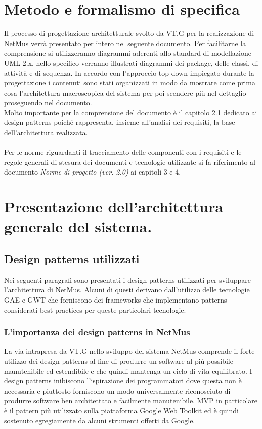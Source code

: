\section{Metodo e formalismo di specifica}
Il processo di progettazione architetturale svolto da VT.G per la
realizzazione di NetMus verr\`a presentato per intero nel seguente documento. Per
facilitarne la comprensione si utilizzeranno diagrammi aderenti allo
standard di modellazione UML 2.x, nello specifico verranno illustrati diagrammi
dei package, delle classi, di attivit\`a e di sequenza.
In accordo con l'approccio top-down impiegato durante la progettazione i
contenuti sono stati organizzati in modo da mostrare come prima cosa
l'architettura macroscopica del sistema per poi scendere pi\`u nel dettaglio
proseguendo nel documento.\\
Molto importante per la comprensione del documento \`e il capitolo 2.1 dedicato
ai design patterns poich\'e rappresenta, insieme all'analisi dei requisiti, la
base dell'architettura realizzata.
\\\\
Per le norme riguardanti il tracciamento delle componenti con i requisiti e le
regole generali di stesura dei documenti e tecnologie utilizzate si fa
riferimento al documento \emph{Norme di progetto (ver. 2.0)} ai capitoli 3 e 4.

\section{Presentazione dell'architettura generale del sistema.}

\subsection{Design patterns utilizzati}
Nei seguenti paragrafi sono presentati i design patterns utilizzati per
sviluppare l'architettura di NetMus. Alcuni di questi derivano dall'utilizzo
delle tecnologie GAE e GWT che forniscono dei frameworks che implementano
patterns considerati best-practices per queste particolari tecnologie.

\subsubsection{L'importanza dei design patterns in NetMus}
La via intrapresa da VT.G nello sviluppo del sistema NetMus comprende il forte
utilizzo dei design patterns al fine di produrre un software al pi\`u
possibile manutenibile ed estendibile e che quindi mantenga un ciclo di
vita equilibrato. 
I design patterns inibiscono l'ispirazione dei programmatori dove
questa non \`e necessaria e piuttosto forniscono un modo universalmente
riconosciuto di produrre software ben architettato e facilmente manutenibile.
MVP in particolare \`e il pattern pi\`u utilizzato sulla piattaforma Google Web
Toolkit ed \`e quindi sostenuto egregiamente da alcuni strumenti offerti da
Google.

